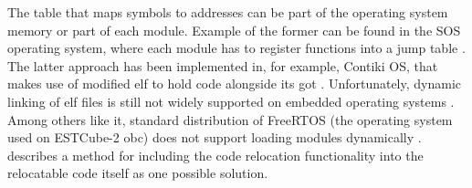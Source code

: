 The table that maps symbols to addresses can be part of the operating system memory or part of each module. Example of the former can be found in the SOS operating system, where each module has to register functions into a jump table \cite{Han2005}. The latter approach has been implemented in, for example, Contiki OS, that makes use of modified \gls{elf} to hold code alongside its \gls{got} \cite{Dunkels2006}. Unfortunately, dynamic linking of \gls{elf} files is still not widely supported on embedded operating systems \cite{Xinyu2017}. Among others like it, standard distribution of FreeRTOS (the operating system used on ESTCube-2 \gls{obc}) does not support loading modules dynamically \cite{Barry2005}. \textcite{Xinyu2017} describes a method for including the code relocation functionality into the relocatable code itself as one possible solution.
